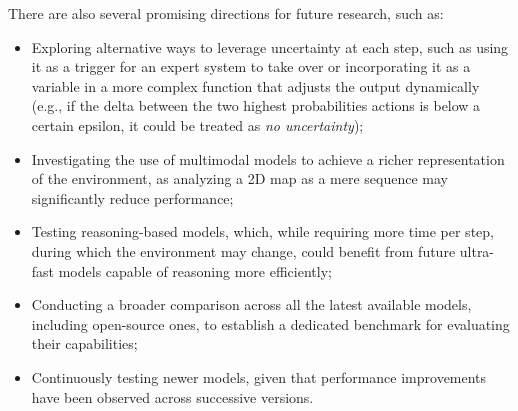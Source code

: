 There are also several promising directions for future research, such as:

\begin{itemize}
  \item Exploring alternative ways to leverage uncertainty at each step, such as
    using it as a trigger for an expert system to take over or incorporating it
    as a variable in a more complex function that adjusts the output dynamically
    (e.g., if the delta between the two highest probabilities actions is below a
    certain epsilon, it could be treated as \emph{no uncertainty});

  \item Investigating the use of multimodal models to achieve a richer representation
    of the environment, as analyzing a 2D map as a mere sequence may
    significantly reduce performance;

  \item Testing reasoning-based models, which, while requiring more time per step,
    during which the environment may change, could benefit from future ultra-fast
    models capable of reasoning more efficiently;

  \item Conducting a broader comparison across all the latest available models,
    including open-source ones, to establish a dedicated benchmark for evaluating
    their capabilities;

  \item Continuously testing newer models, given that performance improvements
    have been observed across successive versions.
\end{itemize}